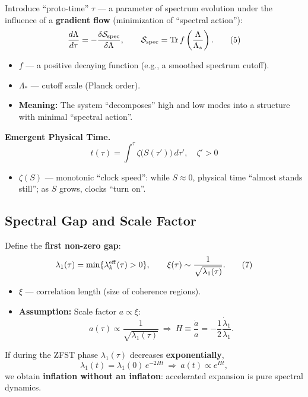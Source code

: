 \documentclass[12pt,a4paper]{article}
\begin{document}
Introduce ``proto-time'' \(\tau\) — a parameter of spectrum evolution under the influence of a \textbf{gradient flow} (minimization of ``spectral action''):
\[
\frac{d\Lambda}{d\tau} = -\frac{\delta \mathcal{S}_{\rm spec}}{\delta \Lambda}, \qquad
\mathcal{S}_{\rm spec} = \mathrm{Tr}\, f\left( \frac{\Lambda}{\Lambda_*} \right). \tag{5}
\]
\begin{itemize}
    \item \(f\) — a positive decaying function (e.g., a smoothed spectrum cutoff).
    \item \(\Lambda_*\) — cutoff scale (Planck order).
    \item \textbf{Meaning:} The system ``decomposes'' high and low modes into a structure with minimal ``spectral action''.
\end{itemize}

\textbf{Emergent Physical Time.}
\[
\boxed{t(\tau) = \int^{\tau} \zeta \big( S(\tau') \big) \, d\tau', \quad \zeta' > 0} \tag{6}
\]
\begin{itemize}
    \item \(\zeta(S)\) — monotonic ``clock speed'': while \(S \approx 0\), physical time ``almost stands still''; as \(S\) grows, clocks ``turn on''.
\end{itemize}

\subsection{Spectral Gap and Scale Factor}
Define the \textbf{first non-zero gap}:
\[
\lambda_1(\tau) = \min \{ \lambda_k^{\rm eff}(\tau) > 0 \}, \qquad
\xi(\tau) \sim \frac{1}{\sqrt{\lambda_1(\tau)}}. \tag{7}
\]
\begin{itemize}
    \item \(\xi\) — correlation length (size of coherence regions).
    \item \textbf{Assumption:} Scale factor \(a \propto \xi\):
    \[
    \boxed{a(\tau) \propto \frac{1}{\sqrt{\lambda_1(\tau)}}} \ \Rightarrow \
    H \equiv \frac{\dot{a}}{a} = -\frac{1}{2} \frac{\dot{\lambda}_1}{\lambda_1}. \tag{8}
    \]
\end{itemize}
If during the ZFST phase \(\lambda_1(\tau)\) decreases \textbf{exponentially},
\[
\lambda_1(t) = \lambda_1(0) \, e^{-2Ht} \ \Rightarrow \ a(t) \propto e^{Ht}, \tag{9}
\]
we obtain \textbf{inflation without an inflaton}: accelerated expansion is pure spectral dynamics.
\end{document}
